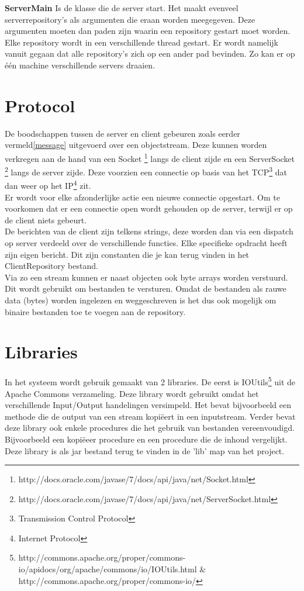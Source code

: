 \documentclass{article}
\begin{document}
\textbf{ServerMain}\label{servermain} Is de klasse die de server start. Het maakt evenveel serverrepository's als argumenten die eraan worden meegegeven. Deze argumenten moeten dan paden zijn waarin een repository gestart moet worden. Elke repository wordt in een verschillende thread gestart. Er wordt namelijk vanuit gegaan dat alle repository's zich op een ander pad bevinden. Zo kan er op \'{e}\'{en} machine verschillende servers draaien. 


\section{Protocol}
\label{sec:protocol}
De boodschappen tussen de server en client gebeuren zoals eerder vermeld\ref{message} uitgevoerd over een objectstream. Deze kunnen worden verkregen aan de hand van een Socket \footnote{http://docs.oracle.com/javase/7/docs/api/java/net/Socket.html} langs de client zijde en een ServerSocket \footnote{http://docs.oracle.com/javase/7/docs/api/java/net/ServerSocket.html} langs de server zijde. Deze voorzien een connectie op basis van het TCP\footnote{Transmission Control Protocol} dat dan weer op het IP\footnote{Internet Protocol} zit.\\
Er wordt voor elke afzonderlijke actie een nieuwe connectie opgestart. Om te voorkomen dat er een connectie open wordt gehouden op de server, terwijl er op de client niets gebeurt.\\
De berichten van de client zijn telkens strings, deze worden dan via een dispatch op server verdeeld over de verschillende functies. Elke specifieke opdracht heeft zijn eigen bericht. Dit zijn constanten die je kan terug vinden in het ClientRepository bestand.\\
Via zo een stream kunnen er naast objecten ook byte arrays worden verstuurd. Dit wordt gebruikt om bestanden te versturen. Omdat de bestanden als rauwe data (bytes) worden ingelezen en weggeschreven is het dus ook mogelijk om binaire bestanden toe te voegen aan de repository.\\



\section{Libraries}
\label{sec:libraries}
In het systeem wordt gebruik gemaakt van 2 libraries. De eerst is IOUtils\footnote{http://commons.apache.org/proper/commons-io/apidocs/org/apache/commons/io/IOUtils.html \& http://commons.apache.org/proper/commons-io/} uit de Apache Commons verzameling. Deze library wordt gebruikt omdat het verschillende Input/Output handelingen versimpeld. Het bevat bijvoorbeeld een methode die de output van een stream kopi\"{eert} in een inputstream. Verder bevat deze library ook enkele procedures die het gebruik van bestanden vereenvoudigd. Bijvoorbeeld een kopi\"{e}eer procedure en een procedure die de inhoud vergelijkt.\\
Deze library is als jar bestand terug te vinden in de 'lib' map van het project.
\end{document}
